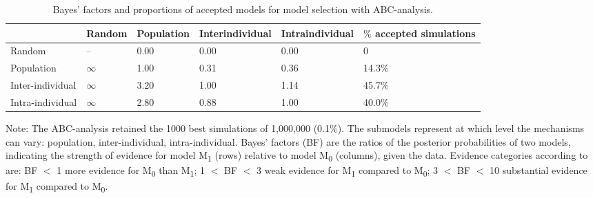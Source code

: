 \documentclass[10pt, twoside]{book} %
\begin{document}
	
	\begin{table}[h!]
		\begin{center}
			\begin{threeparttable}
				
				\begin{footnotesize}
					\caption{Bayes' factors and proportions of accepted models for model selection with ABC-analysis.}  \label{Tab2.1}
					
					\begingroup
					\setlength{\tabcolsep}{6pt} %
					\renewcommand{\arraystretch}{1.5} %
					\begin{tabular}{p{2cm} p{1.5cm} p{1.5cm} p{1.5cm} p{1.5cm} p{1.8cm}}
						
						\toprule
						& \textbf{Random} & \textbf{Population} & \textbf{Inter\-individual} & \textbf{Intra\-individual} & \textbf{$\%$ accepted simulations}\\
						\midrule
						Random & -- & 0.00 & 0.00 & 0.00& 0\\
						Population & $\infty$ & 1.00 & 0.31 & 0.36 & 14.3$\%$\\
						Inter-individual& $\infty$ & 3.20 & 1.00 & 1.14 & 45.7$\%$\\
						Intra-individual & $\infty$ & 2.80 & 0.88 & 1.00 & 40.0$\%$\\
						\bottomrule
					\end{tabular}
					\begin{tablenotes}
						\small
						\item Note: The ABC-analysis retained the 1000 best simulations of 1,000,000 (0.1$\%$). The submodels represent at which level the mechanisms can vary: population, inter-individual, intra-individual. Bayes' factors (BF) are the ratios of the posterior probabilities of two models, indicating the strength of evidence for model M\textsubscript{1} (rows) relative to model M\textsubscript{0} (columns), given the data. Evidence categories according to \citep{kass1995} are: BF $<$ 1 more evidence for M\textsubscript{0} than M\textsubscript{1}; 1 $<$ BF $<$ 3 weak evidence for M\textsubscript{1} compared to M\textsubscript{0}; 3 $<$ BF $<$ 10 substantial evidence for M\textsubscript{1} compared to M\textsubscript{0}.
					\end{tablenotes}\endgroup
				\end{footnotesize}
			\end{threeparttable}
		\end{center}
	\end{table}
	
\end{document}
